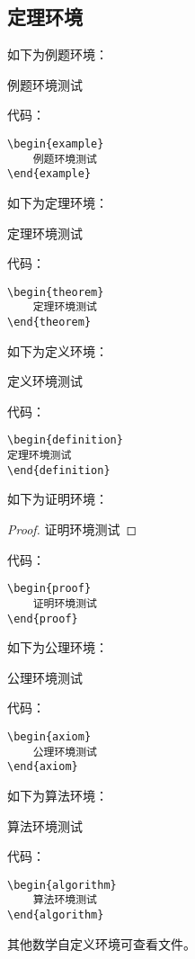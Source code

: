 \subsection{定理环境}
如下为例题环境：
\begin{example}
	例题环境测试
\end{example}
代码：
\begin{lstlisting}
\begin{example}
	例题环境测试
\end{example}
\end{lstlisting}
如下为定理环境：
\begin{theorem}
	定理环境测试
\end{theorem}
代码：
\begin{lstlisting}
\begin{theorem}
	定理环境测试
\end{theorem}
\end{lstlisting}
如下为定义环境：
\begin{definition}
	定义环境测试
\end{definition}
代码：
\begin{lstlisting}
\begin{definition}
定理环境测试
\end{definition}
\end{lstlisting}
如下为证明环境：
\begin{proof}
	证明环境测试
\end{proof}
代码：
\begin{lstlisting}
\begin{proof}
	证明环境测试
\end{proof}
\end{lstlisting}
如下为公理环境：
\begin{axiom}
	公理环境测试
\end{axiom}
代码：
\begin{lstlisting}
\begin{axiom}
	公理环境测试
\end{axiom}
\end{lstlisting}
如下为算法环境：
\begin{algorithm}
	算法环境测试
\end{algorithm}
代码：
\begin{lstlisting}
\begin{algorithm}
	算法环境测试
\end{algorithm}
\end{lstlisting}
其他数学自定义环境可查看文件。


